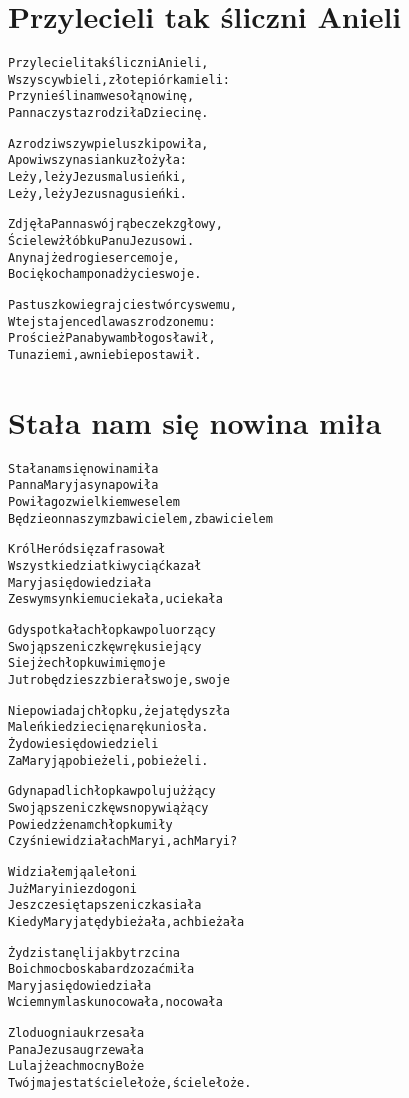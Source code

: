 \documentclass[a4paper,12pt]{article}
\begin{document}
\section*{Przylecieli tak śliczni Anieli}
\begin{alltt}
Przylecieli tak śliczni Anieli,
Wszyscy w bieli, złote piórka mieli:
Przynieśli nam wesołą nowinę,
Panna czysta zrodziła Dziecinę.
 
A zrodziwszy w pieluszki powiła,
A powiwszy na sianku złożyła:
Leży, leży Jezus malusieńki,
Leży, leży Jezus nagusieńki.

Zdjęła Panna swój rąbeczek z głowy,
Ściele w żłóbku Panu Jezusowi.
A nynajże drogie serce moje,
Bo cię kocham ponad życie swoje.

Pastuszkowie grajcie stwórcy swemu,
W tej stajence dla was zrodzonemu:
Proścież Pana by wam błogosławił,
Tu na ziemi, a w niebie postawił.
\end{alltt}


\section*{Stała nam się nowina miła}
\begin{alltt}
Stała nam się nowina miła
Panna Maryja syna powiła
Powiła go z wielkiem weselem
Będzie on naszym zbawicielem, zbawicielem

Król Heród się zafrasował
Wszystkie dziatki wyciąć kazał
Maryja się dowiedziała
Ze swym synkiem uciekała, uciekała

Gdy spotkała chłopka w polu orzący
Swoją pszeniczkę w ręku siejący
Siejże chłopku w imię moje
Jutro będziesz zbierał swoje, swoje

Nie powiadaj chłopku, że ja tędy szła
Maleńkie dziecię na ręku niosła.
Żydowie się dowiedzieli
Za Maryją pobieżeli, pobieżeli.

Gdy napadli chłopka w polu już żący
Swoją pszeniczkę w snopy wiążący
Powiedz że nam chłopku miły
Czyś nie widział ach Maryi, ach Maryi?

Widziałem ją ale łoni
Już Maryi nie zdogoni
Jeszcze się ta pszeniczka siała
Kiedy Maryja tędy bieżała, ach bieżała

Żydzi stanęli jakby trzcina
Bo ich moc boska bardzo zaćmiła
Maryja się dowiedziała
W ciemnym lasku nocowała, nocowała

Z lodu ognia ukrzesała
Pana Jezusa ugrzewała
Lulajże ach mocny Boże
Twój majestat ściele łoże, ściele łoże.
\end{alltt}
\end{document}
